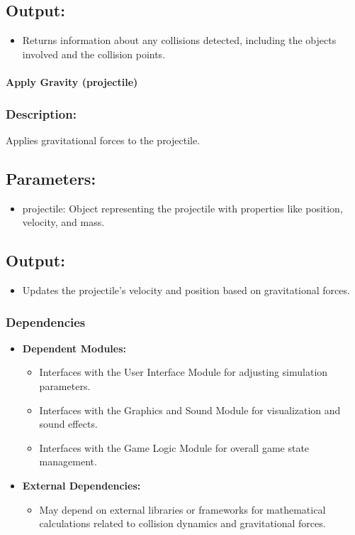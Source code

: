 \documentclass[12pt, titlepage]{article}
\begin{document}
\subsection*{Output:}
\begin{itemize}
  \item Returns information about any collisions detected, including the objects involved and the collision points.
\end{itemize}

\paragraph{Apply Gravity (projectile)}
\subsubsection*{Description:} Applies gravitational forces to the projectile.

\subsection*{Parameters:}
\begin{itemize}
  \item projectile: Object representing the projectile with properties like position, velocity, and mass.
\end{itemize}

\subsection*{Output:}
\begin{itemize}
  \item Updates the projectile's velocity and position based on gravitational forces.
\end{itemize}

\subsubsection{Dependencies}
\begin{itemize}
  \item \textbf{Dependent Modules:}
    \begin{itemize}
  \item Interfaces with the User Interface Module for adjusting simulation parameters.
  \item Interfaces with the Graphics and Sound Module for visualization and sound effects.
  \item Interfaces with the Game Logic Module for overall game state management.
    \end{itemize}
  \item \textbf{External Dependencies:}
    \begin{itemize}
  \item May depend on external libraries or frameworks for mathematical calculations related to collision dynamics and gravitational forces.
    \end{itemize}
\end{itemize}
\end{document}
